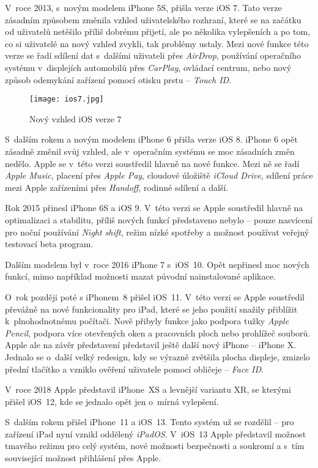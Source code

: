 V~roce 2013, s~novým modelem iPhone 5S, přišla verze iOS 7. Tato verze zásadním způsobem změnila vzhled uživatelského rozhraní, které se na začátku od uživatelů netěšilo příliš dobrému přijetí, ale po několika vylepšeních a po tom, co si uživatelé na nový vzhled zvykli, tak problémy ustaly. Mezi nové funkce této verze se řadí sdílení dat s~dalšími uživateli přes \emph{AirDrop}, používání operačního systému v~displejích automobilů přes \emph{CarPlay}, ovládací centrum, nebo nový způsob odemykání zařízení pomocí otisku prstu – \emph{Touch ID}.

\begin{figure}[h]
	\centering
	\texttt{[image: ios7.jpg]}
	\caption{Nový vzhled iOS verze 7 \cite{ios-7-design}}
\end{figure}

S~dalším rokem a novým modelem iPhone 6 přišla verze iOS 8. iPhone 6 opět zásadně změnil svůj vzhled, ale v~operačním systému se moc zásadních změn nedělo. Apple se v~této verzi soustředil hlavně na nové funkce. Mezi ně se řadí \emph{Apple Music}, placení přes \emph{Apple Pay}, cloudové úložiště \emph{iCloud Drive}, sdílení práce mezi Apple zařízeními přes \emph{Handoff}, rodinné sdílení a další.

Rok 2015 přinesl iPhone 6S a iOS 9. V~této verzi se Apple soustředil hlavně na optimalizaci a stabilitu, příliš nových funkcí představeno nebylo – pouze nasvícení pro noční používání \emph{Night shift}, režim nízké spotřeby a možnost používat veřejný testovací beta program.

Dalším modelem byl v~roce 2016 iPhone 7 s~iOS~10. Opět nepřinesl moc nových funkcí, mimo například možnosti mazat původní nainstalované aplikace.

O~rok později poté s iPhonem~8 přišel iOS~11. V~této verzi se Apple soustředil převážně na nové funkcionality pro iPad, které se jeho použití snažily přiblížit k~plnohodnotnému počítači. Nově přibyly funkce jako podpora tužky \emph{Apple Pencil}, podpora více otevřených oken a pracovních ploch nebo prohlížeč souborů. Apple ale na závěr představení představil ještě další nový iPhone – iPhone X. Jednalo se o~další velký redesign, kdy se výrazně zvětšila plocha displeje, zmizelo přední tlačítko a vzniklo ověření uživatele pomocí obličeje – \emph{Face ID}.

V~roce 2018 Apple představil iPhone~XS a levnější variantu XR, se kterými přišel iOS~12, kde se jednalo opět jen o~mírná vylepšení. 

S~dalším rokem přišel iPhone~11 a iOS~13. Tento systém už se rozdělil – pro zařízení iPad nyní vznikl oddělený \emph{iPadOS}. V~iOS~13 Apple představil možnost tmavého režimu pro celý systém, nové možnosti bezpečnosti a soukromí a s~tím související možnost přihlášení přes Apple.

